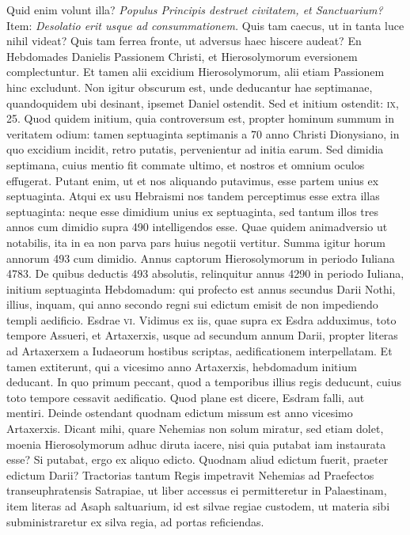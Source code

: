 Quid enim volunt illa?
\textit{Populus Principis destruet civitatem,
et Sanctuarium?}
Item: \textit{Desolatio erit usque ad consummationem.}
Quis tam caecus, ut in tanta luce nihil videat?
Quis tam ferrea fronte, ut adversus haec hiscere audeat?
En Hebdomades
Danielis Passionem Christi, et Hierosolymorum eversionem complectuntur.
Et tamen alii excidium Hierosolymorum, alii etiam
Passionem hinc excludunt.
Non igitur obscurum est, unde deducantur
hae septimanae, quandoquidem ubi desinant, ipsemet Daniel
ostendit.
Sed et initium ostendit: \textsc{ix}, 25.
Quod quidem initium,
quia controversum est, propter hominum summum in veritatem
odium: tamen septuaginta septimanis a 70 anno Christi
Dionysiano, in quo excidium incidit, retro putatis, pervenientur
ad initia earum.
Sed dimidia septimana, cuius mentio fit commate
ultimo, et nostros et omnium oculos effugerat.
Putant enim,
ut et nos aliquando putavimus, esse partem unius ex septuaginta.
Atqui ex usu Hebraismi nos tandem perceptimus esse extra illas septuaginta:
neque esse dimidium unius ex septuaginta, sed tantum
illos tres annos cum dimidio supra 490 intelligendos esse.
Quae
quidem animadversio ut notabilis, ita in ea non parva pars huius
negotii vertitur.
Summa igitur horum annorum 493 cum dimidio.
Annus captorum Hierosolymorum in periodo Iuliana 4783.
De quibus deductis 493 absolutis, relinquitur annus 4290 in periodo
Iuliana, initium septuaginta Hebdomadum: qui profecto
est annus secundus Darii Nothi, illius, inquam, qui anno secondo
regni sui edictum emisit de non impediendo templi aedificio.
Esdrae \textsc{vi}.
Vidimus ex iis, quae supra ex Esdra adduximus, toto tempore
Assueri, et Artaxerxis, usque ad secundum annum Darii, propter
literas ad Artaxerxem a Iudaeorum hostibus scriptas, aedificationem
interpellatam.
Et tamen extiterunt, qui a vicesimo anno
Artaxerxis, hebdomadum initium deducant.
In quo primum
peccant, quod a temporibus illius regis deducunt, cuius toto tempore
cessavit aedificatio.
Quod plane est dicere, Esdram falli, aut mentiri.
Deinde ostendant quodnam edictum missum est anno vicesimo
Artaxerxis.
Dicant mihi, quare Nehemias non solum miratur,
sed etiam dolet, moenia Hierosolymorum adhuc diruta iacere,
nisi quia putabat iam instaurata esse?
Si putabat, ergo ex
aliquo edicto.
Quodnam aliud edictum fuerit, praeter edictum
Darii?
{}
Tractorias tantum Regis impetravit Nehemias ad Praefectos
transeuphratensis Satrapiae, ut liber accessus ei permitteretur
in Palaestinam, item literas ad Asaph saltuarium, id est silvae regiae
custodem, ut materia sibi subministraretur ex silva regia, ad
portas reficiendas.

